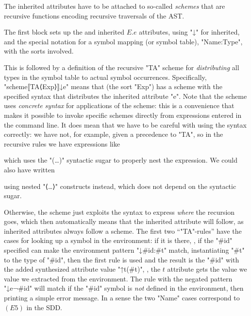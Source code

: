 \documentclass[11pt]{article} %
\begin{document}
\begin{example}\label{ex:analysis-hax-inh}
  The inherited attributes have to be attached to so-called \emph{schemes} that are recursive
  functions encoding recursive traversals of the AST.
  The first block sets up the and inherited $E.e$ attributes, using \HAX "↓" for inherited, and the
  special notation for a symbol mapping (or symbol table), "{Name:Type}", with the sorts involved.

  This is followed by a definition of the recursive "TA" scheme for \emph{distributing} all types in
  the symbol table to actual symbol occurrences. Specifically, "scheme⟦TA⟨Exp⟩⟧↓e" means that (the
  sort "Exp") has a scheme with the specified syntax that distributes the inherited attribute "e".
  Note that the scheme uses \emph{concrete syntax} for applications of the scheme: this is a
  convenience that makes it possible to invoke specific schemes directly from expressions entered in
  the command line. It does mean that we have to be careful with using the syntax correctly: we have
  not, for example, given a precedence to "TA", so in the recursive rules we have expressions like
  which uses the "(…)" syntactic sugar to properly nest the expression.  We could also have written
  using nested "⟨…⟩" constructs instead, which does not depend on the syntactic sugar.

  Otherwise, the scheme just exploits the syntax to express \emph{where} the recursion goes, which
  then automatically means that the inherited attribute will follow, as \HAX inherited attributes
  always follow a scheme.  The first two ``"TA"-rules'' have the cases for looking up a symbol in
  the environment: if it is there, \ie, if the "#id" specified can make the environment pattern
  "↓{#id:#t}" match, instantiating "#t" to the type of "#id", then the first rule is used and the
  result is the "#id" with the added synthesized attribute value "↑t(#t)", \ie, the $t$ attribute
  gets the value we value we extracted from the environment. The rule with the negated pattern
  "↓e{¬#id}" will match if the "#id" symbol is \emph{not} defined in the environment, then printing a
  simple error message.  In a sense the two "Name" cases correspond to $(E5)$ in the SDD.
\end{example}
\end{document}
